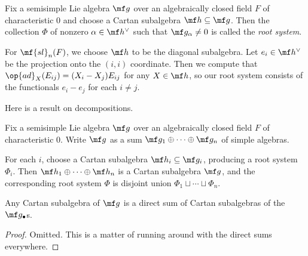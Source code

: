 \documentclass[../notes.tex]{subfiles}
\begin{document}
\begin{definition}
	Fix a semisimple Lie algebra $\mf g$ over an algebraically closed field $F$ of characteristic $0$ and choose a Cartan subalgebra $\mf h\subseteq\mf g$. Then the collection $\Phi$ of nonzero $\alpha\in\mf h^\lor$ such that $\mf g_\alpha\ne0$ is called the \textit{root system}.
\end{definition}
\begin{example}
	For $\mf{sl}_n(F)$, we choose $\mf h$ to be the diagonal subalgebra. Let $e_i\in\mf h^\lor$ be the projection onto the $(i,i)$ coordinate. Then we compute that $\op{ad}_X(E_{ij})=(X_i-X_j)E_{ij}$ for any $X\in\mf h$, so our root system consists of the functionals $e_i-e_j$ for each $i\ne j$.
\end{example}
Here is a result on decompositions.
\begin{proposition}
	Fix a semisimple Lie algebra $\mf g$ over an algebraically closed field $F$ of characteristic $0$. Write $\mf g$ as a sum $\mf g_1\oplus\cdots\oplus\mf g_n$ of simple algebras.
	\begin{listalph}
		\item For each $i$, choose a Cartan subalgebra $\mf h_i\subseteq\mf g_i$, producing a root system $\Phi_i$. Then $\mf h_1\oplus\cdots\oplus\mf h_n$ is a Cartan subalgebra $\mf g$, and the corresponding root system $\Phi$ is disjoint union $\Phi_1\sqcup\cdots\sqcup\Phi_n$.
		\item Any Cartan subalgebra of $\mf g$ is a direct sum of Cartan subalgebras of the $\mf g_\bullet$s.
	\end{listalph}
\end{proposition}
\begin{proof}
	Omitted. This is a matter of running around with the direct sums everywhere.
\end{proof}
\end{document}
